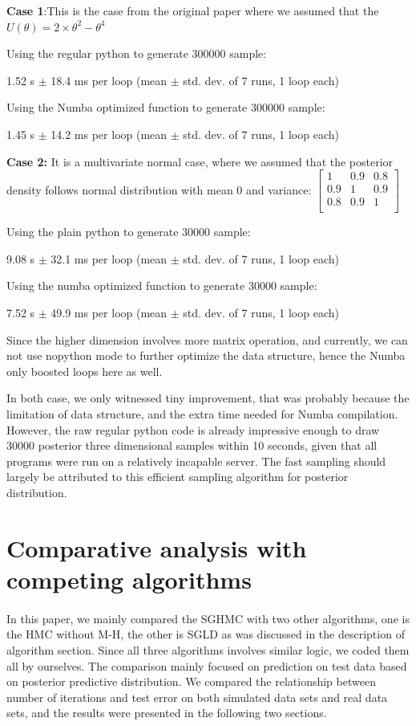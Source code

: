\documentclass[11pt]{article}
\begin{document}
\textbf{Case 1}:This is the case from the original paper where we assumed that the $U(\theta)=2\times\theta^2-\theta^4$  

Using the regular python to generate 300000 sample:      

 1.52 s $\pm$ 18.4 ms per loop (mean $\pm$ std. dev. of 7 runs, 1 loop each)


Using the Numba optimized function to generate 300000 sample:  

1.45 s $\pm$ 14.2 ms per loop (mean $\pm$ std. dev. of 7 runs, 1 loop each)

\textbf{Case 2:}
It is a multivariate normal case, where we assumed that the posterior density follows normal distribution with mean 0 and variance: 
$
\begin{bmatrix} 
1 & 0.9& 0.8\\
0.9 & 1 &0.9\\
0.8 &0.9&1\\
\end{bmatrix}
$

Using the plain python to generate 30000 sample:  

9.08 s $\pm$ 32.1 ms per loop (mean $\pm$ std. dev. of 7 runs, 1 loop each)

Using the numba optimized function to generate 30000 sample:  

 7.52 s $\pm$ 49.9 ms per loop (mean $\pm$ std. dev. of 7 runs, 1 loop each)


Since the higher dimension involves more matrix operation, and currently, we can not use nopython mode to further optimize the data structure, hence the Numba only boosted loops here as well.

In both case, we only witnessed tiny improvement, that was probably because the limitation of data structure, and the extra time needed for Numba compilation. However, the raw regular python code is already impressive enough to draw 30000 posterior three dimensional samples within 10 seconds, given that all programs were run on a relatively incapable server. The fast sampling should largely be attributed to this efficient sampling algorithm for posterior distribution.

\section{Comparative analysis with competing algorithms}
\paragraph{}
In this paper, we mainly compared the SGHMC  with two other algorithms, one is the HMC without M-H, the other is SGLD as was discussed in the description of algorithm section. Since all three algorithms involves similar logic, we coded them all by ourselves. 
The comparison mainly focused on prediction on test data based on posterior predictive distribution. We compared the relationship between number of iterations and test error on both simulated data sets and real data sets, and the results were presented in the following two sections.
\end{document}

